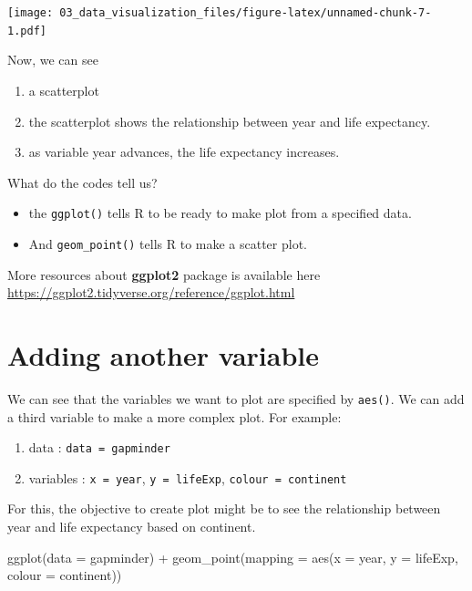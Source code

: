 \documentclass[
  10pt,
]{krantz}
\newenvironment{Shaded}{\begin{snugshade}}{\end{snugshade}}
\newcommand{\AttributeTok}[1]{\textcolor[rgb]{0.77,0.63,0.00}{#1}}
\newcommand{\FunctionTok}[1]{\textcolor[rgb]{0.00,0.00,0.00}{#1}}
\newcommand{\NormalTok}[1]{#1}
\newcommand{\SpecialCharTok}[1]{\textcolor[rgb]{0.00,0.00,0.00}{#1}}
\providecommand{\tightlist}{%
  \setlength{\itemsep}{0pt}\setlength{\parskip}{0pt}}
\begin{document}
\texttt{[image: 03\_data\_visualization\_files/figure-latex/unnamed-chunk-7-1.pdf]}

Now, we can see

\begin{enumerate}
\def\labelenumi{\arabic{enumi}.}
\tightlist
\item
  a scatterplot
\item
  the scatterplot shows the relationship between year and life expectancy.
\item
  as variable year advances, the life expectancy increases.
\end{enumerate}

What do the codes tell us?

\begin{itemize}
\tightlist
\item
  the \texttt{ggplot()} tells R to be ready to make plot from a specified data.
\item
  And \texttt{geom\_point()} tells R to make a scatter plot.
\end{itemize}

More resources about \textbf{ggplot2} package is available here \url{https://ggplot2.tidyverse.org/reference/ggplot.html}

\hypertarget{adding-another-variable}{%
\section{Adding another variable}\label{adding-another-variable}}

We can see that the variables we want to plot are specified by \texttt{aes()}. We can add a third variable to make a more complex plot. For example:

\begin{enumerate}
\def\labelenumi{\arabic{enumi}.}
\tightlist
\item
  data : \texttt{data\ =\ gapminder}
\item
  variables : \texttt{x\ =\ year}, \texttt{y\ =\ lifeExp}, \texttt{colour\ =\ continent}
\end{enumerate}

For this, the objective to create plot might be to see the relationship between year and life expectancy based on continent.

\begin{Shaded}
\begin{Highlighting}[]
\FunctionTok{ggplot}\NormalTok{(}\AttributeTok{data =}\NormalTok{ gapminder) }\SpecialCharTok{+}
  \FunctionTok{geom\_point}\NormalTok{(}\AttributeTok{mapping =} \FunctionTok{aes}\NormalTok{(}\AttributeTok{x =}\NormalTok{ year, }
                           \AttributeTok{y =}\NormalTok{ lifeExp, }
                           \AttributeTok{colour =}\NormalTok{ continent))}
\end{Highlighting}
\end{Shaded}
\end{document}
